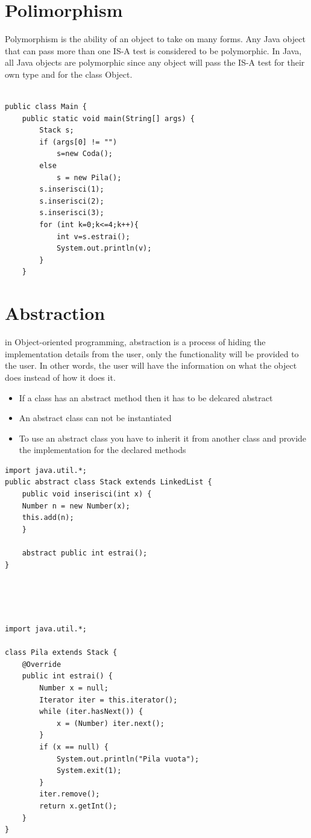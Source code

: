 \documentclass[10pt,a4paper]{book}
\begin{document}
\section{Polimorphism}
Polymorphism is the ability of an object to take on many forms. Any Java object that can pass more than one IS-A test is considered to be polymorphic. In Java, all Java objects are polymorphic since any object will pass the IS-A test for their own type and for the class Object.
\\\\
\begin{verbatim}
public class Main {
    public static void main(String[] args) {
        Stack s;
        if (args[0] != "")
            s=new Coda();
        else
            s = new Pila();
        s.inserisci(1);
        s.inserisci(2);
        s.inserisci(3);
        for (int k=0;k<=4;k++){
            int v=s.estrai();
            System.out.println(v);
        }
    }

\end{verbatim}
\newpage
\section{Abstraction}
in Object-oriented programming, abstraction is a process of hiding the implementation details from the user, only the functionality will be provided to the user. In other words, the user will have the information on what the object does instead of how it does it.
\begin{itemize}
\item If a class has an abstract method then it has to be delcared abstract
\item An abstract class can not be instantiated
\item To use an abstract class you have to inherit it from another class and provide the implementation for the declared methods
\end{itemize}

\begin{verbatim}
import java.util.*;
public abstract class Stack extends LinkedList {
    public void inserisci(int x) {
    Number n = new Number(x);
    this.add(n);
    }

    abstract public int estrai();
}

\end{verbatim}
\\\\\\
\begin{verbatim}
import java.util.*;

class Pila extends Stack {
    @Override
    public int estrai() {
        Number x = null;
        Iterator iter = this.iterator();
        while (iter.hasNext()) {
            x = (Number) iter.next();
        }
        if (x == null) {
            System.out.println("Pila vuota");
            System.exit(1);
        }
        iter.remove();
        return x.getInt();
    }
}

\end{verbatim}
\newpage
\end{document}

